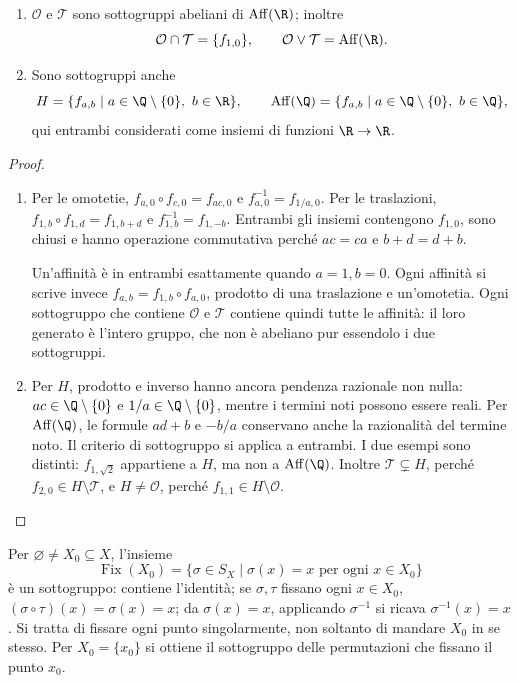 \begin{proposizione}\label{prop:sottogruppi-affini}
\begin{enumerate}[label=\arabic*.]
\item $\mathcal O$ e $\mathcal T$ sono sottogruppi abeliani di $\operatorname{Aff}(\R)$; inoltre
\[
\mathcal O\cap\mathcal T=\{f_{1,0}\},\qquad
\mathcal O\vee\mathcal T=\operatorname{Aff}(\R).
\]
\item Sono sottogruppi anche
\[
H=\{f_{a,b}\mid a\in\Q\setminus\{0\},\ b\in\R\},\qquad
\operatorname{Aff}(\Q)=\{f_{a,b}\mid a\in\Q\setminus\{0\},\ b\in\Q\},
\]
qui entrambi considerati come insiemi di funzioni $\R\to\R$.
\end{enumerate}
\end{proposizione}
\begin{proof}
\begin{enumerate}[label=\arabic*.]
\item Per le omotetie, $f_{a,0}\circ f_{c,0}=f_{ac,0}$ e $f_{a,0}^{-1}=f_{1/a,0}$. Per le traslazioni, $f_{1,b}\circ f_{1,d}=f_{1,b+d}$ e $f_{1,b}^{-1}=f_{1,-b}$. Entrambi gli insiemi contengono $f_{1,0}$, sono chiusi e hanno operazione commutativa perché $ac=ca$ e $b+d=d+b$.

Un'affinità è in entrambi esattamente quando $a=1,b=0$. Ogni affinità si scrive invece $f_{a,b}=f_{1,b}\circ f_{a,0}$, prodotto di una traslazione e un'omotetia. Ogni sottogruppo che contiene $\mathcal O$ e $\mathcal T$ contiene quindi tutte le affinità: il loro generato è l'intero gruppo, che non è abeliano pur essendolo i due sottogruppi.
\item Per $H$, prodotto e inverso hanno ancora pendenza razionale non nulla: $ac\in\Q\setminus\{0\}$ e $1/a\in\Q\setminus\{0\}$, mentre i termini noti possono essere reali. Per $\operatorname{Aff}(\Q)$, le formule $ad+b$ e $-b/a$ conservano anche la razionalità del termine noto. Il criterio di sottogruppo si applica a entrambi. I due esempi sono distinti: $f_{1,\sqrt2}$ appartiene a $H$, ma non a $\operatorname{Aff}(\Q)$. Inoltre $\mathcal T\subsetneq H$, perché $f_{2,0}\in H\setminus\mathcal T$, e $H\ne\mathcal O$, perché $f_{1,1}\in H\setminus\mathcal O$.
\end{enumerate}
\end{proof}

\begin{esempio}
Per $\varnothing\ne X_0\subseteq X$, l'insieme
\[
\operatorname{Fix}(X_0)=\{\sigma\in S_X\mid\sigma(x)=x\text{ per ogni }x\in X_0\}
\]
è un sottogruppo: contiene l'identità; se $\sigma,\tau$ fissano ogni $x\in X_0$, $(\sigma\circ\tau)(x)=\sigma(x)=x$; da $\sigma(x)=x$, applicando $\sigma^{-1}$ si ricava $\sigma^{-1}(x)=x$. Si tratta di fissare ogni punto singolarmente, non soltanto di mandare $X_0$ in se stesso. Per $X_0=\{x_0\}$ si ottiene il sottogruppo delle permutazioni che fissano il punto $x_0$.
\end{esempio}


